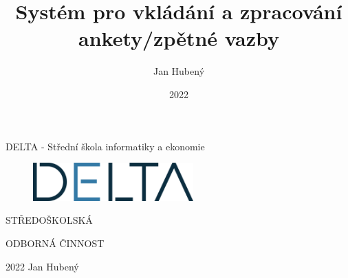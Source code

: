 \documentclass[hidelinks, 12pt, a4paper,
twoside,        %
openright
]{report}
\title{Systém pro vkládání a zpracování ankety/zpětné vazby} %
\author{Jan Hubený} %
\date{2022} %
\begin{document}
	
	\pagestyle{empty}
	
	\begin{titlepage}
		\bfseries{
			\begin{center}
				\fontsize{22}{2}\selectfont DELTA - Střední škola informatiky a ekonomie
				
				\vspace{0.08\textheight}
				
				\begin{figure}[H]
					\centering
					\includegraphics[width=0.55\textwidth]{logo.png}
					
				\end{figure}
				
				\vspace{0.22\textheight}
				
				
				\huge{STŘEDOŠKOLSKÁ}
				
				\huge{ODBORNÁ ČINNOST}
				
				
				\vspace{0.32\textheight}
				
				\noindent\LARGE{2022   Jan Hubený}
				
			\end{center}
		}
	\end{titlepage}
	
\end{document}

